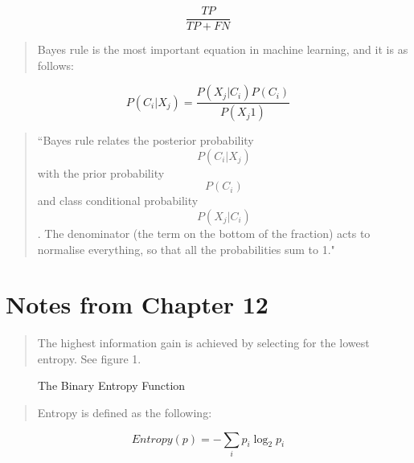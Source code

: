 \documentclass[12pt]{article}
\begin{document}
\begin{equation}
\frac{TP}{TP + FN}
\end{equation}

\begin{verse}
Bayes rule is the most important equation in machine learning, and it is as follows:
\end{verse}

\begin{equation}
P(C_i|X_j) = \frac{P(X_j|C_i)P(C_i)}{P(X_j1)}
\end{equation}

\begin{verse}
``Bayes rule relates the posterior probability $$P(C_i|X_j)$$ with the prior 
probability $$P(C_i)$$ and class conditional probability $$P(X_j|C_i)$$. The denominator (the term on the bottom of the fraction) acts to normalise everything, so that all the probabilities sum to 1."
\end{verse}

\section{Notes from Chapter 12}
\begin{verse}
The highest information gain is achieved by selecting for the lowest entropy. See figure 1.
\end{verse}

\begin{figure}
\centering
{}
\caption{The Binary Entropy Function} \label{fig:M1}
\end{figure}

\begin{verse}
Entropy is defined as the following:
\end{verse}

\begin{equation}
Entropy(p) = -\sum_i{p_i\log_2{p_i}}
\end{equation}
\end{document}
